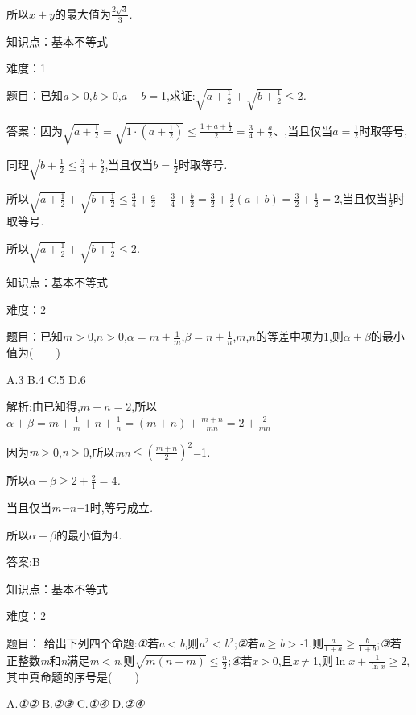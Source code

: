 \documentclass{article} %
\begin{document}
所以\textit{$x+y$}的最大值为$\frac{2\sqrt{3}}{3}$\textit{.}

知识点：基本不等式

难度：1

 题目：已知\textit{a$>$}0,\textit{b$>$}0,\textit{$a+b=$}1,求证:$\sqrt{a+\frac{1}{2}}+\sqrt{b+\frac{1}{2}}$$\mathrm{\le}$2\textit{.}

 答案：因为$\sqrt{a+\frac{1}{2}}=\sqrt{1\cdot(a+\frac{1}{2})} \le \frac{1+a+\frac{1}{2}}{2}=\frac{3}{4}+\frac{a}{2}$、,当且仅当$a=\frac{1}{2}$时取等号,

同理$\sqrt{b+\frac{1}{2}}\le \frac{3}{4}+\frac{b}{2}$,当且仅当$b=\frac{1}{2}$时取等号\textit{.}

所以$\sqrt{a+\frac{1}{2}}+\sqrt{b+\frac{1}{2}}\le \frac{3}{4}+\frac{a}{2}+\frac{3}{4}+\frac{b}{2}=\frac{3}{2}+\frac{1}{2}(a+b)=\frac{3}{2}+\frac{1}{2}=2$,当且仅当$\frac{1}{2}$时取等号\textit{.}

所以$\sqrt{a+\frac{1}{2}}+\sqrt{b+\frac{1}{2}}$$\mathrm{\le}$2\textit{.}

知识点：基本不等式

难度：2

 题目：已知$m>0$,$n>0$,$\alpha=m+\frac{1}{m}$,$\beta=n+\frac{1}{n}$,$m$,$n$的等差中项为1,则$\alpha+\beta$的最小值为(\textit{　　})

 A.3 B.4 C.5 D.6

 解析:由已知得,$m+n=2$,所以$\alpha+\beta=m+\frac{1}{m}+n+\frac{1}{n}=(m+n)+\frac{m+n}{mn}=2+\frac{2}{mn}$

因为\textit{m$>$}0,\textit{n$>$}0,所以\textit{mn}$\mathrm{\le}{(\frac{m+n}{2})}^2$\textit{=}1\textit{.}

所以$\alpha+\beta \ge 2+ \frac{2}{1}=4$\textit{.}

当且仅当\textit{m=n=}1时,等号成立\textit{.}

所以\textit{$\alpha+\beta$}的最小值为4\textit{.}

 答案:B

知识点：基本不等式

难度：2

 题目： 给出下列四个命题:\textit{①}若\textit{a$<$b},则\textit{a}${}^{2}$\textit{$<$b}${}^{2}$;\textit{②}若\textit{a}$\mathrm{\ge}$\textit{b$>$-}1,则$\frac{a}{1+a} \ge \frac{b}{1+b}$;\textit{③}若正整数\textit{m}和\textit{n}满足\textit{m$<$n},则$\sqrt{m(n-m)} \le \frac{n}{2}$;\textit{④}若\textit{x$>$}0,且\textit{x}$\mathrm{\neq}$1,则$\ln x+ \frac{1}{\ln x} \ge 2$,其中真命题的序号是(\textit{　　})

 A.\textit{①②} B.\textit{②③} C.\textit{①④} D.\textit{②④}
\end{document}
